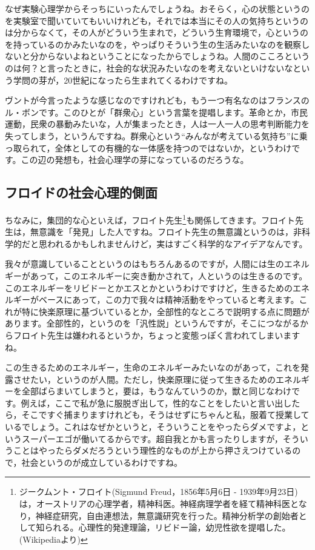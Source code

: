 \documentclass{ltjsbook}
\begin{document}
なぜ実験心理学からそっちにいったんでしょうね。おそらく，心の状態というのを実験室で聞いていてもいいけれども，それでは本当にその人の気持ちというのは分からなくて，その人がどういう生まれで，どういう生育環境で，心というのを持っているのかみたいなのを，やっぱりそういう生の生活みたいなのを観察しないと分からないよねということになったからでしょうね。人間のこころというのは何？と言ったときに，社会的な状況みたいなのを考えないといけないなという学問の芽が，20世紀になったら生まれてくるわけですね。

ヴントが今言ったような感じなのですけれども，もう一つ有名なのはフランスのル・ボンです。このひとが「群衆心」という言葉を提唱します。革命とか，市民運動，民衆の暴動みたいな，人が集まったとき，人は一人一人の思考判断能力を失ってしまう，というんですね。群衆心という``みんなが考えている気持ち''に乗っ取られて，全体としての有機的な一体感を持つのではないか，というわけです。この辺の発想も，社会心理学の芽になっているのだろうな。

\subsection{フロイドの社会心理的側面}

ちなみに，集団的な心といえば，フロイト先生\footnote{ジークムント・フロイト(Sigmund Freud，1856年5月6日 - 1939年9月23日)は，オーストリアの心理学者，精神科医。神経病理学者を経て精神科医となり，神経症研究，自由連想法，無意識研究を行った。精神分析学の創始者として知られる。心理性的発達理論，リビドー論，幼児性欲を提唱した。(Wikipediaより)}も関係してきます。フロイト先生は，無意識を「発見」した人ですね。フロイト先生の無意識というのは，非科学的だと思われるかもしれませんけど，実はすごく科学的なアイデアなんです。

我々が意識していることというのはもちろんあるのですが，人間には生のエネルギーがあって，このエネルギーに突き動かされて，人というのは生きるのです。このエネルギーをリビドーとかエスとかというわけですけど，生きるためのエネルギーがベースにあって，この力で我々は精神活動をやっていると考えます。これが特に快楽原理に基づいているとか，全部性的なところで説明する点に問題があります。全部性的，というのを「汎性説」というんですが，そこにつながるからフロイト先生は嫌われるというか，ちょっと変態っぽく言われてしまいますね。

この生きるためのエネルギー，生命のエネルギーみたいなのがあって，これを発露させたい，というのが人間。ただし，快楽原理に従って生きるためのエネルギーを全部ばらまいてしまうと，要は，もうなんていうのか，獣と同じなわけです。例えば，ここで私が急に服脱ぎ出して，性的なことをしたいと言い出したら，そこですぐ捕まりますけれども，そうはせずにちゃんと私，服着て授業しているでしょう。これはなぜかというと，そういうことをやったらダメですよ，というスーパーエゴが働いてるからです。超自我とかも言ったりしますが，そういうことはやったらダメだろうという理性的なものが上から押さえつけているので，社会というのが成立しているわけですね。
\end{document}
